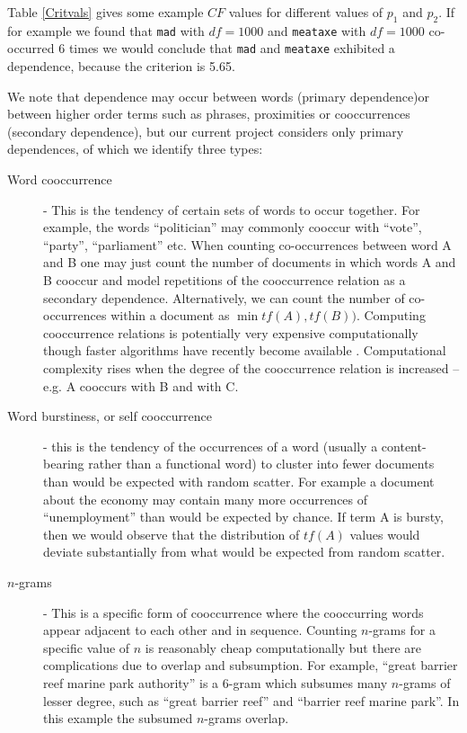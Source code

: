 \documentclass[11pt]{report}
\begin{document}
Table \ref{Critvals} gives some example $CF$ values for different
values of $p_1$ and $p_2$.  If for example we found that \texttt{mad} with
$\mathit{df}=1000$ and \texttt{meataxe} with $\mathit{df}=1000$ co-occurred 6
times we would conclude that \texttt{mad} and \texttt{meataxe} exhibited a dependence, because
the criterion is 5.65.

We note that dependence may occur between words (primary dependence)or between
higher order terms such as phrases, proximities or cooccurrences
(secondary dependence), but our current project considers only primary
dependences, of which we identify three types:

\begin{description}
  \item [Word cooccurrence] - This is the tendency of certain sets
    of words to occur together.  For example, the words ``politician''
    may commonly cooccur with ``vote'', ``party'', ``parliament'' etc.
    When counting co-occurrences between word A and B one may just
    count the number of documents
    in which words A and B cooccur and model repetitions of the
    cooccurrence relation as a secondary dependence.  Alternatively,
    we can count the number of co-occurrences within a document as
    $\min{\mathit{tf}(A), \mathit{tf}(B))}$.  Computing cooccurrence
      relations is potentially very expensive computationally though
      faster algorithms have recently become available \cite{Bodo}.
      Computational complexity
      rises when the degree of the cooccurrence relation is increased
      -- e.g. A cooccurs with B and with C.
  \item [Word burstiness, or self cooccurrence] - this is the
    tendency of the occurrences of a word (usually
    a content-bearing rather than a functional word) to cluster into
    fewer documents than would be expected with random scatter.   For
    example a document about the economy may contain many more
    occurrences of ``unemployment'' than would be expected by chance.
    If term A is bursty, then we would observe that the distribution
    of $\mathit{tf}(A)$ values would deviate substantially from what
    would be expected from random scatter.
  \item [$n$-grams] - This is a specific form of cooccurrence where the
    cooccurring words appear adjacent to each other and in sequence.
    Counting $n$-grams for a specific value of $n$ is reasonably cheap
    computationally but there are complications due to overlap and subsumption.  For
    example, ``great barrier reef marine park authority'' is a 6-gram
    which subsumes many $n$-grams of lesser degree, such as ``great
    barrier reef'' and ``barrier reef marine park''.  In this example
    the subsumed $n$-grams overlap.
\end{description}
\end{document}
